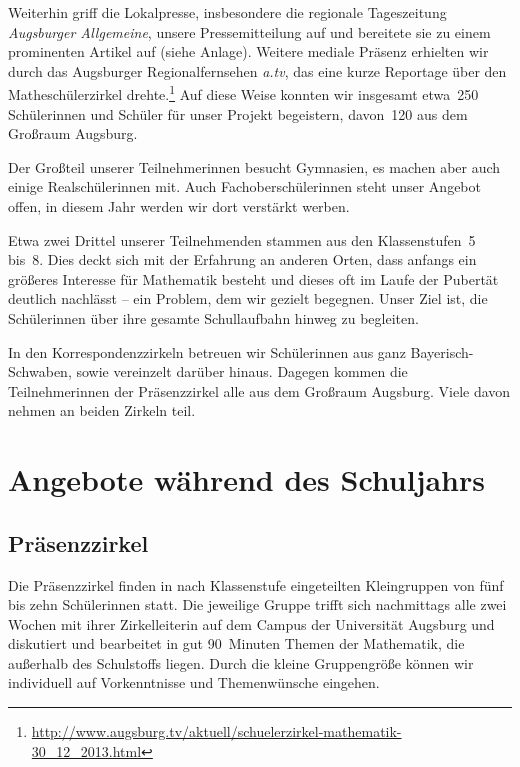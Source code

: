 \documentclass[12pt]{zettel}
\begin{document}
Weiterhin griff die Lokalpresse, insbesondere die regionale Tageszeitung
\emph{Augsburger Allgemeine}, unsere Pressemitteilung auf und bereitete sie zu einem prominenten Artikel auf (siehe Anlage). Weitere mediale Präsenz erhielten wir durch das Augsburger
Regionalfernsehen \emph{a.tv}, das eine kurze Reportage über den Matheschülerzirkel drehte.\footnote{\href{http://www.augsburg.tv/aktuell/schuelerzirkel-mathematik-30_12_2013.html}{\textsf{http:/\!/www.augsburg.tv/aktuell/schuelerzirkel-mathematik-30\_{}12\_{}2013.html}}} Auf diese Weise konnten wir insgesamt etwa~250 Schülerinnen und Schüler für
unser Projekt begeistern, davon~120 aus dem Großraum Augsburg.

Der Großteil unserer Teilnehmerinnen besucht Gymnasien, es machen aber auch einige Realschülerinnen mit. Auch Fachoberschülerinnen steht unser Angebot offen, in diesem Jahr werden wir dort verstärkt werben.

Etwa zwei Drittel unserer Teilnehmenden
stammen aus den Klassenstufen~5 bis~8.
Dies deckt sich mit der
Erfahrung an anderen Orten, dass anfangs ein größeres Interesse für
Mathematik besteht und dieses oft im Laufe der Pubertät
deutlich nachlässt -- ein Problem, dem wir gezielt begegnen. Unser Ziel ist, die Schülerinnen über ihre gesamte Schullaufbahn hinweg zu begleiten.

In den Korrespondenzzirkeln betreuen wir Schülerinnen aus ganz Bayerisch-Schwaben, sowie vereinzelt darüber hinaus. Dagegen kommen die Teilnehmerinnen
der Prä\-senz\-zir\-kel alle aus dem Großraum Augsburg. Viele davon
nehmen an beiden Zirkeln teil.


\section{Angebote während des Schuljahrs}

\subsection{Präsenzzirkel}

Die Präsenzzirkel finden in nach Klassenstufe eingeteilten
Kleingruppen von fünf bis zehn Schülerinnen statt.
Die jeweilige Gruppe trifft sich nachmittags alle zwei Wochen mit ihrer Zirkelleiterin auf dem Campus der Universität Augsburg und diskutiert und
bearbeitet in gut 90~Minuten Themen der Mathematik, die außerhalb des
Schulstoffs liegen. Durch die kleine Gruppengröße können wir individuell auf
Vorkenntnisse und Themenwünsche eingehen.
\end{document}
